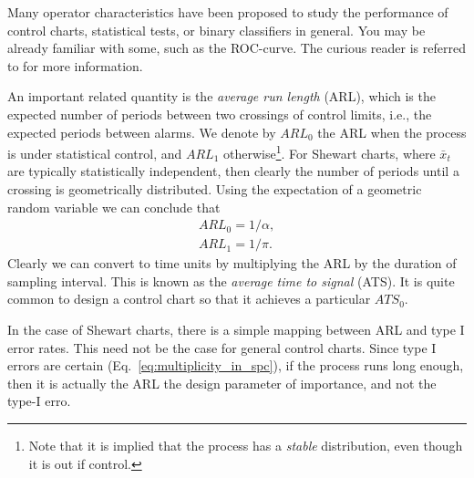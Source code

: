 \begin{extra}
Many operator characteristics have been proposed to study the performance of control charts, statistical tests, or binary classifiers in general.
You may be already familiar with some, such as the ROC-curve. 
The curious reader is referred to \cite{wikipedia_receiver_2015} for more information.
\end{extra}


An important related quantity is the \emph{average run length} (ARL), which is the expected number of periods between two crossings of control limits, i.e., the expected periods between alarms. 
We denote by $ARL_0$ the ARL when the process is under statistical control, and $ARL_1$ otherwise\footnote{Note that it is implied that the process has a \emph{stable} distribution, even though it is out if control.}. 
For Shewart charts, where $\bar{x}_t$ are typically statistically independent, then clearly the number of periods until a crossing is geometrically distributed. Using the expectation of a geometric random variable we can conclude that 
\begin{align}
	ARL_0=1/\alpha \label{eq:arl_0}, \\
	ARL_1=1/\pi \label{eq:arl_1}.
\end{align}
Clearly we can convert to time units by multiplying the ARL by the duration of sampling interval.
This is known as the \emph{average time to signal} (ATS).
It is quite common to design a control chart so that it achieves a particular $ATS_0$.

\begin{remark}
In the case of Shewart charts, there is a simple mapping between ARL and type I error rates.
This need not be the case for general control charts. 
Since type I errors are certain (Eq.~\ref{eq:multiplicity_in_spc}), if the process runs long enough, then it is actually the ARL the design parameter of importance, and not the type-I erro.
\end{remark}


